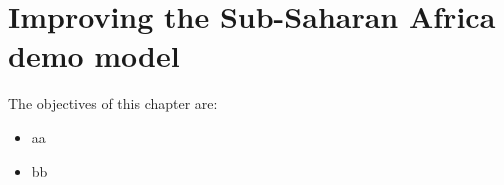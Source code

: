 \documentclass[11pt,a4paper,headings=small,dvips]{scrbook}
\newenvironment{myfancybox}{%
  \def\FrameCommand{\fboxsep=\FrameSep \fcolorbox{blue01}{honeydew}}%
  \color{black}\MakeFramed {\FrameRestore}}%
 {\endMakeFramed}
\begin{document}
\chapter{Improving the Sub-Saharan Africa demo model}
\begin{myfancybox}
The objectives of this chapter are:
\begin{itemize}
    \item aa
    \item bb
\end{itemize}
\end{myfancybox}
    
\cleardoublepage


\cleardoublepage
\end{document}
